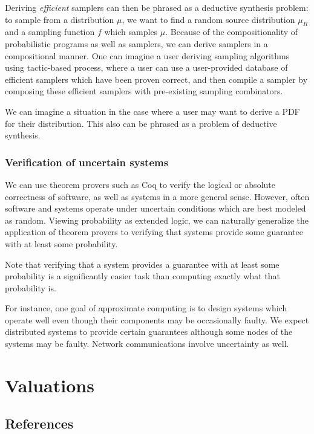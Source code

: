 \documentclass{article}           %
\begin{document}
Deriving \emph{efficient} samplers can then be phrased as a deductive synthesis problem: to sample from a distribution $\mu$, we want to find a random source distribution $\mu_R$ and a sampling function $f$ which samples $\mu$. Because of the compositionality of probabilistic programs as well as samplers, we can derive samplers in a compositional manner. One can imagine a user deriving sampling algorithms using tactic-based process, where a user can use a user-provided database of efficient samplers which have been proven correct, and then compile a sampler by composing these efficient samplers with pre-existing sampling combinators.

We can imagine a situation in the case where a user may want to derive a PDF for their distribution. This also can be phrased as a problem of deductive synthesis.

\subsubsection{Verification of uncertain systems}

We can use theorem provers such as Coq to verify the logical or absolute correctness of software, as well as systems in a more general sense. However, often software and systems operate under uncertain conditions which are best modeled as random. Viewing probability as extended logic, we can naturally generalize the application of theorem provers to verifying that systems provide some guarantee with at least some probability. 

Note that verifying that a system provides a guarantee with at least some probability is a significantly easier task than computing exactly what that probability is.

For instance, one goal of approximate computing is to design systems which operate well even though their components may be occasionally faulty. We expect distributed systems to provide certain guarantees although some nodes of the systems may be faulty. Network communications involve uncertainty as well.

\section{Valuations}

\subsection{References}
\end{document}
